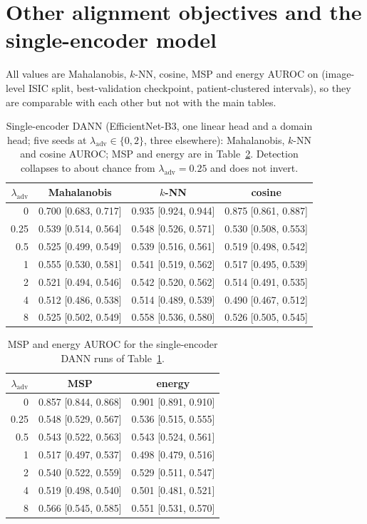 \documentclass{midl}
\newcommand{\lam}{\lambda_{\mathrm{adv}}}
\begin{document}


\appendix

\FloatBarrier
\section{Other alignment objectives and the single-encoder model}
\label{app:single}

All values are Mahalanobis, $k$-NN, cosine, MSP and energy AUROC on \texttt{}
(image-level ISIC split, best-validation checkpoint, patient-clustered intervals), so they
are comparable with each other but not with the main tables.

\begin{table}[h]
\centering
\caption{Single-encoder DANN (EfficientNet-B3, one linear head and a domain head; five seeds at
$\lam\in\{0,2\}$, three elsewhere): Mahalanobis, $k$-NN and cosine AUROC; MSP and energy are in Table~\ref{tab:single-b}. Detection collapses to about chance from $\lam=0.25$ and
does not invert.}
\label{tab:single}
\begin{tabular}{rccc}
\toprule
$\lam$ & Mahalanobis & $k$-NN & cosine \\
\midrule
0 & 0.700 [0.683, 0.717] & 0.935 [0.924, 0.944] & 0.875 [0.861, 0.887] \\
0.25 & 0.539 [0.514, 0.564] & 0.548 [0.526, 0.571] & 0.530 [0.508, 0.553] \\
0.5 & 0.525 [0.499, 0.549] & 0.539 [0.516, 0.561] & 0.519 [0.498, 0.542] \\
1 & 0.555 [0.530, 0.581] & 0.541 [0.519, 0.562] & 0.517 [0.495, 0.539] \\
2 & 0.521 [0.494, 0.546] & 0.542 [0.520, 0.562] & 0.514 [0.491, 0.535] \\
4 & 0.512 [0.486, 0.538] & 0.514 [0.489, 0.539] & 0.490 [0.467, 0.512] \\
8 & 0.525 [0.502, 0.549] & 0.558 [0.536, 0.580] & 0.526 [0.505, 0.545] \\
\bottomrule
\end{tabular}
\end{table}

\begin{table}[h]
\centering
\caption{MSP and energy AUROC for the single-encoder DANN runs of Table~\ref{tab:single}.}
\label{tab:single-b}
\begin{tabular}{rcc}
\toprule
$\lam$ & MSP & energy \\
\midrule
0 & 0.857 [0.844, 0.868] & 0.901 [0.891, 0.910] \\
0.25 & 0.548 [0.529, 0.567] & 0.536 [0.515, 0.555] \\
0.5 & 0.543 [0.522, 0.563] & 0.543 [0.524, 0.561] \\
1 & 0.517 [0.497, 0.537] & 0.498 [0.479, 0.516] \\
2 & 0.540 [0.522, 0.559] & 0.529 [0.511, 0.547] \\
4 & 0.519 [0.498, 0.540] & 0.501 [0.481, 0.521] \\
8 & 0.566 [0.545, 0.585] & 0.551 [0.531, 0.570] \\
\bottomrule
\end{tabular}
\end{table}
\end{document}
